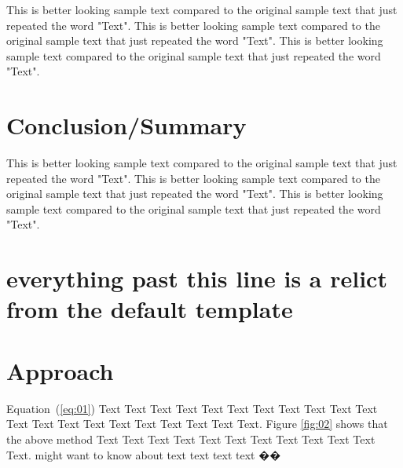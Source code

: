 \documentclass{bioinfo}
\begin{document}
This is better looking sample text compared to the original sample text that just repeated the word "Text". This is better looking sample text compared to the original sample text that just repeated the word "Text". This is better looking sample text compared to the original sample text that just repeated the word "Text".


\section{Conclusion/Summary}

This is better looking sample text compared to the original sample text that just repeated the word "Text". This is better looking sample text compared to the original sample text that just repeated the word "Text". This is better looking sample text compared to the original sample text that just repeated the word "Text".

\section{everything past this line is a relict from the default template}

\section{Approach}

Equation~(\ref{eq:01}) Text Text Text Text Text Text  Text Text Text Text Text Text Text Text Text  Text Text Text Text Text Text. Figure \ref{fig:02} shows that the above method  Text Text Text Text  Text Text Text Text Text Text  Text Text.  \citealp{Boffelli03} might want to know about  text text text text ��
\end{document}
